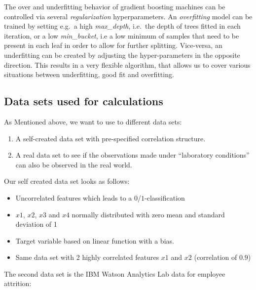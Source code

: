 \documentclass[]{krantz}
\providecommand{\tightlist}{%
  \setlength{\itemsep}{0pt}\setlength{\parskip}{0pt}}
\begin{document}
The over and underfitting behavior of gradient boosting machines can be
controlled via several \emph{regularization} hyperparameters. An
\emph{overfitting} model can be trained by setting e.g.~a high
\emph{max\_depth}, i.e.~the depth of trees fitted in each iteration, or
a low \emph{min\_bucket}, i.e a low minimum of samples that need to be
present in each leaf in order to allow for further splitting.
Vice-versa, an underfitting can be created by adjusting the
hyper-parameters in the opposite direction. This results in a very
flexible algorithm, that allows us to cover various situations between
underfitting, good fit and overfitting.

\subsection{Data sets used for
calculations}\label{data-sets-used-for-calculations}

As Mentioned above, we want to use to different data sets:

\begin{enumerate}
\def\labelenumi{\arabic{enumi}.}
\item
  A self-created data set with pre-specified correlation structure.
\item
  A real data set to see if the observations made under ``laboratory
  conditions'' can also be observed in the real world.
\end{enumerate}

Our self created data set looks as follows:

\begin{itemize}
\tightlist
\item
  Uncorrelated features which leads to a \(0\)/\(1\)-classification
\item
  \(x1\), \(x2\), \(x3\) and \(x4\) normally distributed with zero mean
  and standard deviation of 1
\item
  Target variable based on linear function with a bias.
\item
  Same data set with 2 highly correlated features \(x1\) and \(x2\)
  (correlation of \(0.9\))
\end{itemize}

The second data set is the IBM Watson Analytics Lab data for employee
attrition:
\end{document}
